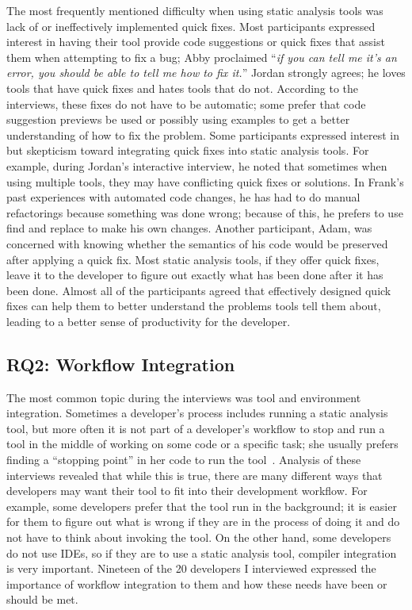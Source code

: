 The most frequently mentioned difficulty when using static analysis tools was
lack of or ineffectively implemented quick fixes.
Most participants expressed interest in having their tool provide code
suggestions or quick fixes that assist them when attempting to fix a bug; Abby
proclaimed ``\emph{if you can tell me it's an error, you should be able to tell
me how to fix it.}'' Jordan strongly agrees; he loves tools that have quick
fixes and hates tools that do not. According to the interviews, these fixes do
not have to be automatic; some prefer that code suggestion previews be used or
possibly using examples to get a better understanding of how to fix the problem.
Some participants expressed interest in but skepticism toward integrating quick
fixes into static analysis tools. For example, during Jordan's interactive
interview, he noted that sometimes when using multiple tools, they may
have conflicting quick fixes or solutions. In Frank's past experiences with
automated code changes, he has had to do manual refactorings because something
was done wrong; because of this, he prefers to use find and replace to make
his own changes. Another participant, Adam, was concerned with knowing whether
the semantics of his code would be preserved after applying a quick fix. Most
static analysis tools, if they offer quick fixes, leave it to the developer to
figure out exactly what has been done after it has been done. Almost all of the participants agreed 
that effectively designed quick fixes can help them to better
understand the problems tools tell them about, leading to a better
sense of productivity for the developer.


\subsection{RQ2: Workflow Integration}
\label{subsec:rq2}

The most common topic during the interviews was
tool and environment integration. Sometimes a developer's process includes
running a static analysis tool, but more often it is not part of a
developer's workflow to stop and run a tool in the middle of working on some
code or a specific task; she usually prefers finding a ``stopping
point'' in her code to run the tool~\cite{Layman:2007:FaultFix}. Analysis of
these interviews revealed that while this is true, there are many different ways
that developers may want their tool to fit into their development workflow. For
example, some developers prefer that the tool run in the background; it
is easier for them to figure out what is wrong if they are in the process of
doing it and do not have to think about invoking the tool.
On the other hand, some developers do not
use IDEs, so if they are to use a static analysis tool, compiler
integration is very important. Nineteen of the 20 developers I interviewed
expressed the importance of workflow integration to them and how these needs have
been or should be met.

